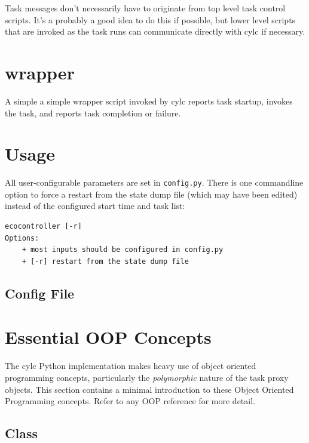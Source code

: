 \documentclass[11pt,a4paper]{article}
\begin{document}
Task messages don't necessarily have to originate from top level task
control scripts. It's a probably a good idea to do this if possible, but
lower level scripts that are invoked as the task runs can communicate
directly with cylc if necessary.

\section{wrapper}

A simple a simple wrapper script invoked by cylc reports task
startup, invokes the task, and reports task completion or failure. 


\label{usage}
\section{Usage}

All user-configurable parameters are set in \verb#config.py#. There is
one commandline option to force a restart from the state dump file
(which may have been edited) instead of the configured start time and
task list:

\lstset{language=sh}

{
\begin{lstlisting}
ecocontroller [-r]
Options:
    + most inputs should be configured in config.py
    + [-r] restart from the state dump file
\end{lstlisting}
}

\lstset{language=Python}

\subsection{Config File}

{
\color{Magenta}

}



\appendix

\section{Essential OOP Concepts}

The cylc Python implementation makes heavy use of object oriented
programming concepts, particularly the {\em polymorphic} nature of
the task proxy objects.  This section contains a minimal introduction
to these Object Oriented Programming concepts.  Refer to any OOP
reference for more detail.

\subsection{Class}
\end{document}
